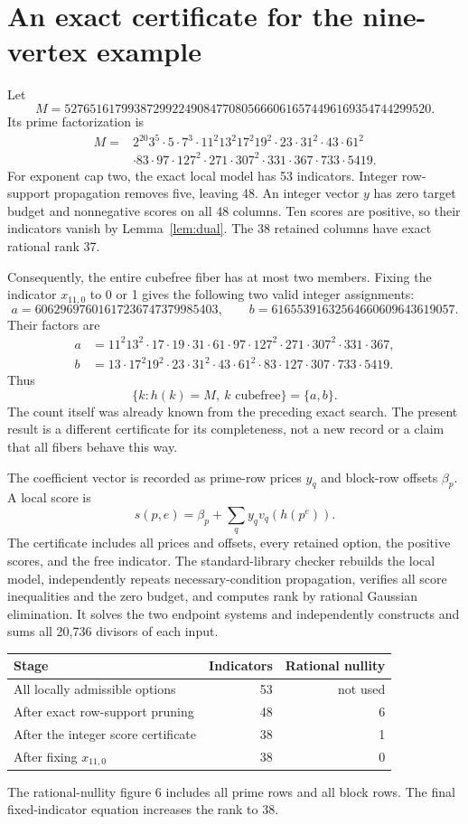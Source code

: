 \documentclass[11pt]{article}
\begin{document}
\section{An exact certificate for the nine-vertex example}
Let
\[
 M=5276516179938729922490847708056660616574496169354744299520.
\]
Its prime factorization is
\begin{align*}
 M={}&2^{20}3^5\cdot5\cdot7^3\cdot11^2 13^2 17^2 19^2\cdot23\cdot31^2\cdot43\cdot61^2\\
 &\cdot83\cdot97\cdot127^2\cdot271\cdot307^2\cdot331\cdot367\cdot733\cdot5419.
\end{align*}
For exponent cap two, the exact local model has 53 indicators. Integer row-support propagation removes five, leaving 48. An integer vector $y$ has zero target budget and nonnegative scores on all 48 columns. Ten scores are positive, so their indicators vanish by Lemma~\ref{lem:dual}. The 38 retained columns have exact rational rank 37.

Consequently, the entire cubefree fiber has at most two members. Fixing the indicator $x_{11,0}$ to 0 or 1 gives the following two valid integer assignments:
\[
 a=60629697601617236747379985403,\qquad
 b=61655391632564660609643619057.
\]
Their factors are
\begin{align*}
 a&=11^2 13^2\cdot17\cdot19\cdot31\cdot61\cdot97\cdot127^2\cdot271\cdot307^2\cdot331\cdot367,\\
 b&=13\cdot17^2 19^2\cdot23\cdot31^2\cdot43\cdot61^2\cdot83\cdot127\cdot307\cdot733\cdot5419.
\end{align*}
Thus
\[
 \boxed{\{k:h(k)=M,\ k\text{ cubefree}\}=\{a,b\}.}
\]
The count itself was already known from the preceding exact search. The present result is a different certificate for its completeness, not a new record or a claim that all fibers behave this way.

The coefficient vector is recorded as prime-row prices $y_q$ and block-row offsets $\beta_p$. A local score is
\[
 s(p,e)=\beta_p+\sum_q y_qv_q(h(p^e)).
\]
The certificate includes all prices and offsets, every retained option, the positive scores, and the free indicator. The standard-library checker rebuilds the local model, independently repeats necessary-condition propagation, verifies all score inequalities and the zero budget, and computes rank by rational Gaussian elimination. It solves the two endpoint systems and independently constructs and sums all 20,736 divisors of each input.

\begin{center}
\begin{tabular}{@{}lrr@{}}
\toprule
Stage & Indicators & Rational nullity\\
\midrule
All locally admissible options & 53 & not used\\
After exact row-support pruning & 48 & 6\\
After the integer score certificate & 38 & 1\\
After fixing $x_{11,0}$ & 38 & 0\\
\bottomrule
\end{tabular}
\end{center}
The rational-nullity figure 6 includes all prime rows and all block rows. The final fixed-indicator equation increases the rank to 38.
\end{document}
